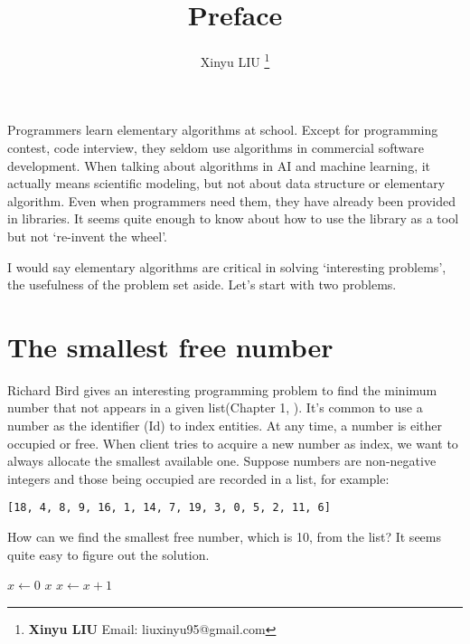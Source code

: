 \documentclass[b5paper]{article}
\begin{document}
\title{Preface}

\author{Xinyu LIU
\thanks{{\bfseries Xinyu LIU} \newline
  Email: liuxinyu95@gmail.com \newline}
  }

\maketitle
\fi


Programmers learn elementary algorithms at school. Except for programming contest, code interview, they seldom use algorithms in commercial software development. When talking about algorithms in AI and machine learning, it actually means scientific modeling, but not about data structure or elementary algorithm. Even when programmers need them, they have already been provided in libraries. It seems quite enough to know about how to use the library as a tool but not `re-invent the wheel'.

I would say elementary algorithms are critical in solving `interesting problems', the usefulness of the problem set aside. Let's start with two problems.

\section{The smallest free number}
\label{min-free} 

Richard Bird gives an interesting programming problem to find the minimum number that not appears in a given list(Chapter 1, \cite{Bird-book}). It's common to use a number as the identifier (Id) to index entities. At any time, a number is either occupied or free. When client tries to acquire a new number as index, we want to always allocate the smallest available one. Suppose numbers are non-negative integers and those being occupied are recorded in a list, for example:

\begin{verbatim}
[18, 4, 8, 9, 16, 1, 14, 7, 19, 3, 0, 5, 2, 11, 6]
\end{verbatim}

How can we find the smallest free number, which is 10, from the list? It seems quite easy to figure out the solution.

\begin{algorithmic}[1]
  \State $x \gets 0$
  \Loop
      \State \Return $x$
    \Else
      \State $x \gets x + 1$
    \EndIf
  \EndLoop
\EndFunction
\end{algorithmic}
\end{document}
